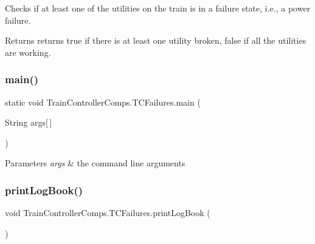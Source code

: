 Checks if at least one of the utilities on the train is in a failure state, i.\+e., a power failure. 

\begin{DoxyReturn}{Returns}
returns true if there is at least one utility broken, false if all the utilities are working. 
\end{DoxyReturn}
\mbox{\label{classTrainControllerComps_1_1TCFailures_a6c248a0171ceab80ac94ea966e97d5ba}} 
\subsubsection{\texorpdfstring{main()}{main()}}
{\footnotesize\ttfamily static void Train\+Controller\+Comps.\+T\+C\+Failures.\+main (\begin{DoxyParamCaption}\item[{String}]{args\mbox{[}$\,$\mbox{]} }\end{DoxyParamCaption})\hspace{0.3cm}{\ttfamily [static]}}


\begin{DoxyParams}{Parameters}
{\em args} & the command line arguments \\
\hline
\end{DoxyParams}
\mbox{\label{classTrainControllerComps_1_1TCFailures_a0e826ca632b3289ad5b68ca93bb2fd11}} 
\subsubsection{\texorpdfstring{print\+Log\+Book()}{printLogBook()}}
{\footnotesize\ttfamily void Train\+Controller\+Comps.\+T\+C\+Failures.\+print\+Log\+Book (\begin{DoxyParamCaption}{ }\end{DoxyParamCaption})\hspace{0.3cm}{\ttfamily [private]}}




